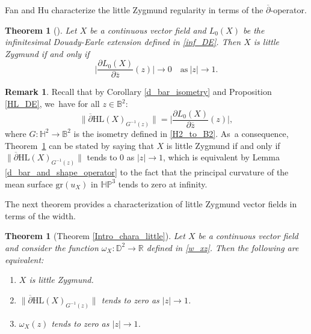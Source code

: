 \documentclass[11pt]{article}
\theoremstyle{plain}
\newtheorem{theorem}[cor]{Theorem}
\theoremstyle{definition}
\newtheorem{remark}[cor]{Remark}
\newcommand{\HP}{\mathbb{HP}^3}
\begin{document}
Fan and Hu characterize the little Zygmund regularity in terms of the $\overline{\partial}$-operator.
\begin{theorem}[{\cite[Th.\,3]{FanJun}}]\label{fan_hu_little}
Let $X$ be a continuous vector field and $L_0(X)$ be the infinitesimal Douady-Earle extension defined in \eqref{inf_DE}. Then $X$ is little Zygmund if and only if\vspace*{-3pt}
\[
\biggl|\frac{\partial L_0(X)}{\partial \overline{z}}(z)\biggr| \to 0 \quad \text{as}\ \lvert z\rvert\to 1.
\]
\end{theorem}
\begin{remark}\label{remark_little_zygmund}
Recall that by Corollary \ref{d_bar_isometry} and Proposition \ref{HL_DE}, we~have for all \(z \in \mathbb{B}^2\):\vspace*{-3pt}
\begin{equation}
\lVert \overline{\partial} \mathrm{HL}(X)_{G^{-1}(z)} \rVert = \biggl| \frac{\partial L_0(X)}{\partial \overline{z}}(z) \biggr|,
\end{equation}
where \(G: \mathbb{H}^2 \to \mathbb{B}^2\) is the isometry defined in \eqref{H2_to_B2}. As~a consequence, Theorem~\ref{fan_hu_little} can be stated by saying that \(X\) is little Zygmund if and only if
\(\lVert \overline{\partial} \mathrm{HL}(X)_{G^{-1}(z)} \rVert\) tends to $0$ as \(\lvert z \rvert \to 1\), which is equivalent by Lemma \ref{d_bar_and_shape_operator} to the fact that the principal curvature of the mean surface \(\mathrm{gr}(u_X)\) in \(\HP\) tends to zero at infinity.
\end{remark}

The next theorem provides a characterization of little Zygmund vector fields in terms of the width.

\begin{theorem}[Theorem \ref{Intro_chara_little}]\label{LZVF}
\label{width_goes_to_0}
Let $X$ be a continuous vector field and consider the function $\omega_{X}:\mathbb{D}^2\to \mathbb{R}$ defined in \eqref{w_xz}. Then the following are equivalent:
\begin{enumerate}
\item\label{LZVF1} $X$ is little Zygmund.
\item\label{LZVF2} $\lVert \overline{\partial}\mathrm{HL}(X)_{G^{-1}(z)}\rVert$ tends to zero as $\lvert z\rvert\to 1$.
\item\label{LZVF3} $\omega_X(z)$ tends to zero as $\lvert z\rvert\to 1$.
\end{enumerate}
\end{theorem}
\end{document}
